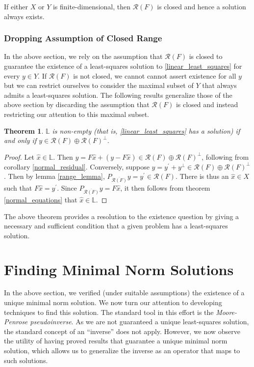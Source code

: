 \documentclass[12pt]{article}
\newcommand{\R}{\mathcal{R}}
\newtheorem{thm}{Theorem}
\begin{document}
If either $X$ or $Y$ is finite-dimensional, then $\R(F)$ is closed and hence a solution always exists. 

\subsubsection{Dropping Assumption of Closed Range}

In the above section, we rely on the assumption that $\R(F)$ is closed to guarantee the existence of a least-squares solution
to \eqref{linear_least_squares} for every $y \in Y$. 
If $\R(F)$ is not closed, we cannot cannot assert existence for all $y$  
but we can restrict ourselves to consider the maximal subset of $Y$ that always admits a least-squares solution. 
The following results generalize those of the above section by discarding the assumption that $\R(F)$ is closed and instead 
restricting our attention to this maximal subset. 

\begin{thm} 
$\mathbb{L}$ is non-empty (that is, \eqref{linear_least_squares} has a solution) if and only if $y \in \R(F) \oplus \R(F)^\perp$. 
\end{thm} 

\begin{proof} 
Let $\hat{x} \in \mathbb{L}$. Then $y = F\hat{x} + (y - F\hat{x}) \in \R(F) \oplus \R(F)^\perp$, following from corollary 
\ref{normal_residual}. Conversely, suppose $y = y^\prime + y^\perp \in \R(F) \oplus \R(F)^\perp$. Then by lemma 
\ref{range_lemma}, $P_{\overline{\R(F)}}y = y^\prime \in \R(F)$. There is thus an $\hat{x} \in X$ such that 
$F\hat{x} = y^\prime$. Since $P_{\overline{\R(F)}}y = F\hat{x}$, it then follows from theorem \ref{normal_equations} that 
$\hat{x} \in \mathbb{L}$. 
\end{proof} 

The above theorem provides a resolution to the existence question by giving a necessary and sufficient condition that 
a given problem has a least-squares solution. 

\section{Finding Minimal Norm Solutions}
 
In the above section, we verified (under suitable assumptions) the existence of a unique minimal norm solution. 
We now turn our attention to developing techniques to find this solution. The standard tool in this effort is the 
\textit{Moore-Penrose pseudoinverse}. As we are not guaranteed a unique least-squares solution, 
the standard concept of an ``inverse'' does not apply. However, we now observe the utility of having 
proved results that guarantee a unique minimal norm solution, which allows us to generalize the 
inverse as an operator that maps to such solutions. 
 
\end{document}
